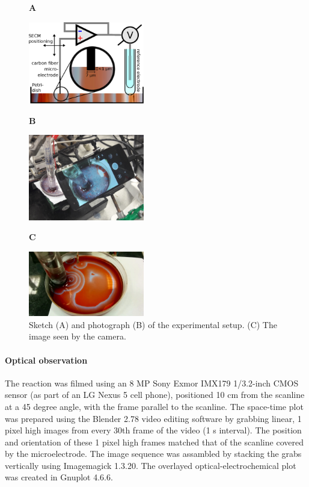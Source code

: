 \documentclass[3p, twocolumn]{elsarticle}
\begin{document}
\begin{figure}
\centering
\begin{flushleft}
\textbf{A}
\end{flushleft}

\includegraphics[width=0.45\textwidth]{setup.eps}

\begin{flushleft}
\textbf{B}
\end{flushleft}

\includegraphics[width=0.45\textwidth]{setup_photo.jpg}

\begin{flushleft}
\textbf{C}
\end{flushleft}

\includegraphics[width=0.45\textwidth]{0.png}

\caption{
Sketch (A) and photograph (B) of the experimental setup. (C) The image seen by the camera.
}
\label{fig:setup}
\end{figure}

\paragraph{Optical observation}
The reaction was filmed using an 8 MP Sony Exmor IMX179 1/3.2-inch CMOS sensor (as part of an LG Nexus 5 cell phone), positioned 10 cm from the scanline at a 45 degree angle, with the frame parallel to the scanline.
The space-time plot was prepared using the Blender 2.78 video editing software by grabbing linear, 1 pixel high images from every 30th frame of the video (1 s interval).
The position and orientation of these 1 pixel high frames matched that of the scanline covered by the microelectrode.
The image sequence was assambled by stacking the grabs vertically using Imagemagick 1.3.20.
The overlayed optical-electrochemical plot was created in Gnuplot 4.6.6.
\end{document}

